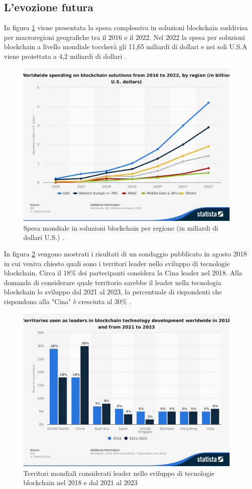 \subsection{L'evozione futura}
In figura \ref{fig:global-blockchain-solutions-spending} viene presentata la spesa complessiva
in soluzioni blockchain suddivisa per macroregioni geografiche tra il 2016 e il 2022.
Nel 2022 la spesa per soluzioni blockchain a livello mondiale toccherà gli 11,65 miliardi di dollari
e nei soli U.S.A viene proiettata a 4,2 miliardi di dollari \cite{global-blockchain-solutions-spending}.
\begin{figure}[H]
	\centering
	\includegraphics[width=.55\linewidth]{images/chap_intro/global-blockchain-solutions-spending.pdf}
	\caption{Spesa mondiale in soluzioni blockchain per regione (in miliardi di
		dollari U.S.) \cite{global-blockchain-solutions-spending}.}
	\label{fig:global-blockchain-solutions-spending}
\end{figure}

In figura \ref{fig:leading-territories-worldwide} vengono mostrati i risultati di un sondaggio
pubblicato in agosto 2018 in cui veniva chiesto
quali sono i territori leader nello sviluppo di tecnologie blockchain.
Circa il 18\% dei partecipanti considera la Cina leader nel 2018.
Alla domanda di considerare quale territorio sarebbe il leader nella tecnologia blockchain
lo sviluppo dal 2021 al 2023, la percentuale di rispondenti che
rispondono alla "Cina" è cresciuta al 30\% \cite{leading-territories-worldwide}.

\begin{figure}[H]
	\centering
	\includegraphics[width=.55\linewidth]{images/chap_intro/leading-territories-worldwide.pdf}
	\caption{Territori mondiali considerati leader nello sviluppo di tecnologie blockchain
		nel 2018 e dal 2021 al 2023
		\cite{leading-territories-worldwide}}
	\label{fig:leading-territories-worldwide}
\end{figure}

